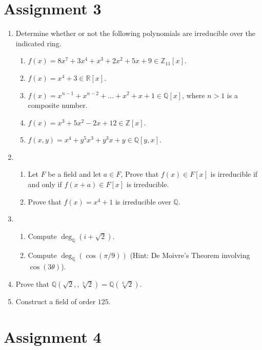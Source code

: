 \documentclass[notoc,notitlepage,nobib]{tufte-book}
\begin{document}

\section{Assignment 3}%
\label{sec:assignment_3}

\begin{enumerate}
	\item Determine whether or not the following polynomials are irreducible over
    the indicated ring.
    \begin{enumerate}
      \item $f(x) = 8x^7 + 3x^4 + x^3 + 2x^2 + 5x + 9 \in \mathbb{Z}_{11}[x]$.
      \item $f(x) = x^4 + 3 \in \mathbb{R}[x]$.
      \item $f(x) = x^{n - 1} + x^{n - 2} + \hdots + x^2 + x + 1 \in
        \mathbb{Q}[x]$, where $n > 1$ is a composite number.
      \item $f(x) = x^3 + 5x^2 - 2x + 12 \in \mathbb{Z}[x]$.
      \item $f(x, y) = x^4 + y^5 x^3 + y^3 x + y \in \mathbb{Q}[y, x]$.
    \end{enumerate}
  \item \begin{enumerate}
      \item Let $F$ be a field and let $a \in F$, Prove that $f(x) \in F[x]$ is
        irreducible if and only if $f(x + a) \in F[x]$ is irreducible.
        \label{item:a3q2a}
      \item Prove that $f(x) = x^4 + 1$ is irreducible over $\mathbb{Q}$.
    \end{enumerate}
  \item \begin{enumerate}
      \item Compute $\deg_{\mathbb{Q}}(i + \sqrt{2})$.
      \item Compute $\deg_{\mathbb{Q}}(\cos(\pi / 9))$ (Hint: De Moivre's
        Theorem involving $\cos(3 \theta)$).
    \end{enumerate}
  \item Prove that $\mathbb{Q}(\sqrt{2},, \sqrt[3]{2}) = \mathbb{Q}(\sqrt[6]{2})$.
  \item Construct a field of order $125$.
\end{enumerate}


\section{Assignment 4}%
\label{sec:assignment_4}
\end{document}
